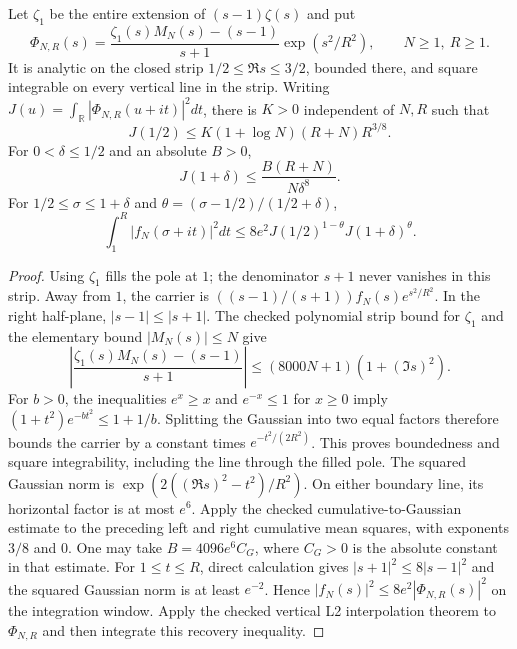 \begin{lemma}
\label{construction:mollifier-gaussian}
\leanok
Let $\zeta_1$ be the entire extension of $(s-1)\zeta(s)$ and put
\[
 \Phi_{N,R}(s)=
 \frac{\zeta_1(s)M_N(s)-(s-1)}{s+1}\exp(s^2/R^2),\qquad N\ge1,\ R\ge1.
\]
It is analytic on the closed strip $1/2\le\Re s\le3/2$, bounded there,
and square integrable on every vertical line in the strip.
Writing $J(u)=\int_{\mathbb R}|\Phi_{N,R}(u+it)|^2dt$, there is $K>0$
independent of $N,R$ such that
\[
 J(1/2)\le K(1+\log N)(R+N)R^{3/8}.
\]
For $0<\delta\le1/2$ and an absolute $B>0$,
\[
 J(1+\delta)\le\frac{B(R+N)}{N\delta^8}.
\]
For $1/2\le\sigma\le1+\delta$ and
$\theta=(\sigma-1/2)/(1/2+\delta)$,
\[
 \int_1^R|f_N(\sigma+it)|^2dt
 \le8e^2J(1/2)^{1-\theta}J(1+\delta)^\theta.
\]
\end{lemma}
\begin{proof}
Using $\zeta_1$ fills the pole at $1$; the denominator $s+1$ never
vanishes in this strip.  Away from $1$, the carrier is
$((s-1)/(s+1))f_N(s)e^{s^2/R^2}$.
In the right half-plane, $|s-1|\le|s+1|$.
The checked polynomial strip bound for $\zeta_1$ and the elementary
bound $|M_N(s)|\le N$ give
\[
 \left|\frac{\zeta_1(s)M_N(s)-(s-1)}{s+1}\right|
 \le(8000N+1)(1+(\Im s)^2).
\]
For $b>0$, the inequalities $e^x\ge x$ and $e^{-x}\le1$ for $x\ge0$
imply $(1+t^2)e^{-bt^2}\le1+1/b$.
Splitting the Gaussian into two equal factors therefore bounds the
carrier by a constant times $e^{-t^2/(2R^2)}$.
This proves boundedness and square integrability, including the line
through the filled pole.
The squared Gaussian norm is $\exp(2((\Re s)^2-t^2)/R^2)$.
On either boundary line, its horizontal factor is at most $e^6$.
Apply the checked cumulative-to-Gaussian estimate to the preceding
left and right cumulative mean squares, with exponents $3/8$ and $0$.
One may take $B=4096e^6C_G$, where $C_G>0$ is the absolute constant
in that estimate.
For $1\le t\le R$, direct calculation gives
$|s+1|^2\le8|s-1|^2$ and the squared Gaussian norm is at least $e^{-2}$.
Hence $|f_N(s)|^2\le8e^2|\Phi_{N,R}(s)|^2$ on the integration window.
Apply the checked vertical L2 interpolation theorem to $\Phi_{N,R}$
and then integrate this recovery inequality.
\end{proof}
